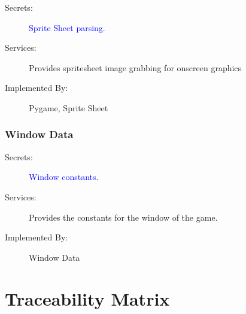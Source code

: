 \documentclass[12pt, titlepage]{article}
\begin{document}
\begin{description}
  \item[Secrets:] \textcolor{blue}{Sprite Sheet parsing.}
  \item[Services:] Provides spritesheet image grabbing for onscreen graphics
  \item[Implemented By:] Pygame, Sprite Sheet
\end{description}

\subsubsection{Window Data}

\begin{description}
  \item[Secrets:] \textcolor{blue}{Window constants.}
  \item[Services:] Provides the constants for the window of the game.
  \item[Implemented By:] Window Data 
\end{description}

\section{Traceability Matrix} \label{SecTM}
\end{document}
